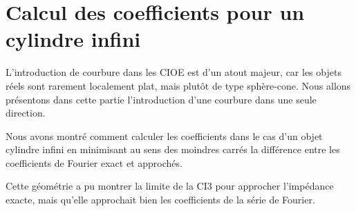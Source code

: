 \chapter{Calcul des coefficients pour un cylindre infini}
\label{sec:cylindre}
\minitoc
\newpage
{}
L'introduction de courbure dans les CIOE est d'un atout majeur, car les objets réels sont rarement localement plat, mais plutôt de type sphère-cone. Nous allons présentons dans cette partie l'introduction d'une courbure dans une seule direction.





Nous avons montré comment calculer les coefficients dans le cas d'un objet cylindre infini en minimisant au sens des moindres carrés la différence entre les coefficients de Fourier exact et approchés. 

Cette géométrie a pu montrer la limite de la CI3 pour approcher l'impédance exacte, mais qu'elle approchait bien les coefficients de la série de Fourier.
